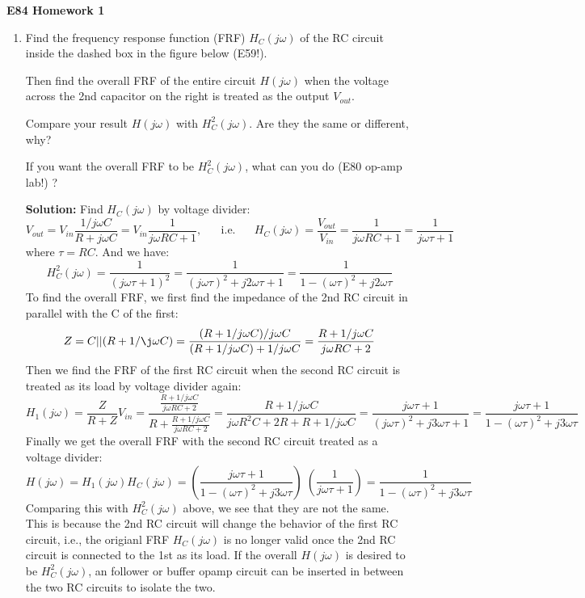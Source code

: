 \usepackage{html}

\begin{center}
{\Large \bf E84 Homework 1}
\end{center}
\begin{enumerate}


\item Find the frequency response function (FRF) $H_C(j\omega)$ of the RC circuit 
  inside the dashed box in the figure below (E59!). 

  Then find the overall FRF of the entire circuit $H(j\omega)$ when the voltage across 
  the 2nd capacitor on the right is treated as the output $V_{out}$. 

  Compare your result $H(j\omega)$ with $H^2_C(j\omega)$. Are they the same or different, 
  why?

  If you want the overall FRF to be $H^2_C(j\omega)$, what can you do (E80 op-amp lab!) ?


  {\bf Solution:} Find $H_C(j\omega)$ by voltage divider:
  \[  V_{out}=V_{in}\frac{1/j\omega C}{R+j\omega C}=V_{in}\frac{1}{j\omega RC+1},
  \;\;\;\;\;\;\mbox{i.e.}\;\;\;\;\;\;
  H_C(j\omega)=\frac{V_{out}}{V_{in}}=\frac{1}{j\omega RC+1}=\frac{1}{j\omega\tau+1} \]
  where $\tau=RC$. And we have:
  \[ H^2_C(j\omega)=\frac{1}{(j\omega\tau+1)^2}=\frac{1}{(j\omega\tau)^2+j2\omega\tau+1}
  =\frac{1}{1-(\omega\tau)^2+j2\omega\tau}
  \]
  To find the overall FRF, we first find the impedance of the 2nd RC circuit in
  parallel with the C of the first:
  \[ Z=C || (R+1/\j\omega C)=\frac{(R+1/j\omega C)/j\omega C}{(R+1/j\omega C)+1/j\omega C}
  =\frac{R+1/j\omega C}{j\omega RC+2} \]
  Then we find the FRF of the first RC circuit when the second RC circuit is treated as
  its load by voltage divider again:
  \[ H_1(j\omega)=\frac{Z}{R+Z}V_{in}
  =\frac{\frac{R+1/j\omega C}{j\omega RC+2}}{R+\frac{R+1/j\omega C}{j\omega RC+2}}
  =\frac{R+1/j\omega C}{j\omega R^2C+2R+R+1/j\omega C}
  =\frac{j\omega\tau+1}{(j\omega\tau)^2+j3\omega\tau+1}   
  =\frac{j\omega\tau+1}{1-(\omega\tau)^2+j3\omega\tau }
  \]
  Finally we get the overall FRF with the second RC circuit treated as a voltage divider:
  \[ H(j\omega)=H_1(j\omega) H_C(j\omega)
  =\left(\frac{j\omega\tau+1}{1-(\omega\tau)^2+j3\omega\tau}\right)\;
  \left(\frac{1}{j\omega\tau+1}\right)=\frac{1}{1-(\omega\tau)^2+j3\omega\tau}  \]
  Comparing this with $H^2_C(j\omega)$ above, we see that they are not the same.
  This is because the 2nd RC circuit will change the behavior of the first RC circuit, 
  i.e., the origianl FRF $H_C(j\omega)$ is no longer valid once the 2nd RC circuit is
  connected to the 1st as its load. If the overall $H(j\omega)$ is desired to be 
  $H^2_C(j\omega)$, an follower or buffer opamp circuit can be inserted in between 
  the two RC circuits to isolate the two.


\end{enumerate}

